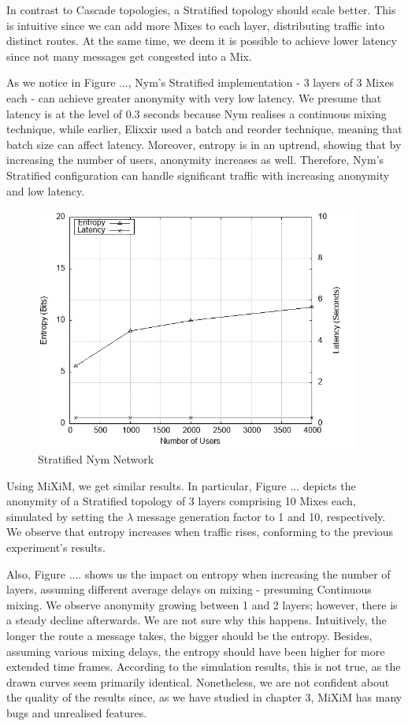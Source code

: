 \documentclass[logo,msc,cyber]{infthesis}   %
\begin{document}
 In contrast to Cascade topologies, a Stratified topology should scale better.
 This is intuitive since we can add more Mixes to each layer, distributing
 traffic into distinct routes. At the same time, we deem it is possible to
 achieve lower latency since not many messages get congested into a Mix. 

 As we notice in Figure ..., Nym's Stratified implementation - 3 layers
 of 3 Mixes each - can achieve greater anonymity with very low latency. We
 presume that latency is at the level of 0.3 seconds because Nym realises a
 continuous mixing technique, while earlier, Elixxir used a batch and reorder
 technique, meaning that batch size can affect latency. Moreover, entropy is in
 an uptrend, showing that by increasing the number of users, anonymity increases
 as well. Therefore, Nym's Stratified configuration can handle significant
 traffic with increasing anonymity and low latency.

\begin{figure}[h!]
    \centering
    \includegraphics[height=8cm]{figures/simulator/2.png}
    \caption{Stratified Nym Network}
    \label{fig:nym-stratified}
 \end{figure}

 Using MiXiM, we get similar results. In particular, Figure ... depicts the
 anonymity of a Stratified topology of 3 layers comprising 10 Mixes each,
 simulated by setting the $\lambda$ message generation factor to 1 and 10,
 respectively. We observe that entropy increases when traffic rises, conforming
 to the previous experiment's results.

 Also, Figure .... shows us the impact on entropy when increasing the number of
 layers, assuming different average delays on mixing - presuming Continuous
 mixing. We observe anonymity growing between 1 and 2 layers; however, there is
 a steady decline afterwards. We are not sure why this happens.
 Intuitively, the longer the route a message takes, the bigger should be the
 entropy. Besides, assuming various mixing delays, the entropy should have been
 higher for more extended time frames. According to the simulation results, this
 is not true, as the drawn curves seem primarily identical. Nonetheless, we are
 not confident about the quality of the results since, as we have studied in
 chapter 3, MiXiM has many bugs and unrealised features.
\end{document}
